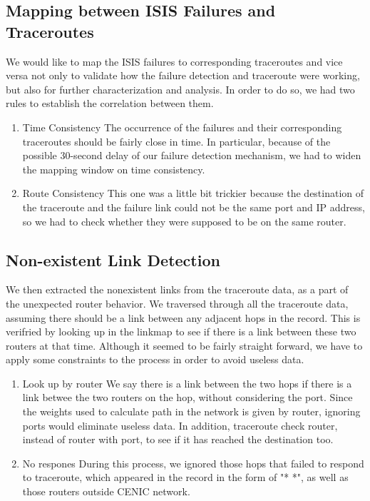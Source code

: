 \documentclass[conference, twocolumn, oneside, 10pt]{IEEEtran}
\begin{document}
\subsection{Mapping between ISIS Failures and Traceroutes}

We would like to map the ISIS failures to corresponding traceroutes and vice versa not only to validate how the failure detection and traceroute were working, but also for further characterization and analysis. In order to do so, we had two rules to establish the correlation between them.

\begin{enumerate}

\item{Time Consistency} The occurrence of the failures and their corresponding traceroutes should be fairly close in time. In particular, because of the possible 30-second delay of our failure detection mechanism, we had to widen the mapping window on time consistency.

\item{Route Consistency} This one was a little bit trickier because the destination of the traceroute and the failure link could not be the same port and IP address, so we had to check whether they were supposed to be on the same router.

\end{enumerate}

\subsection{Non-existent Link Detection}
We then extracted the nonexistent links from the traceroute data, as a part of the unexpected router behavior. We traversed through all the traceroute data, assuming there should be a link between any adjacent hops in the record. This is verifried by looking up in the linkmap to see if there is a link between these two routers at that time. Although it seemed to be fairly straight forward, we have to apply some constraints to the process in order to avoid useless data.

\begin{enumerate}

\item{Look up by router} We say there is a link between the two hops if there is a link betwee the two routers on the hop, without considering the port. Since the weights used to calculate path in the network is given by router, ignoring ports would eliminate useless data. In addition, traceroute check router, instead of router with port, to see if it has reached the destination too. 

\item{No respones} During this process, we ignored those hops that failed to respond to traceroute, which appeared in the record in the form of "* *", as well as those routers outside CENIC network. 

\end{enumerate}
\end{document}
